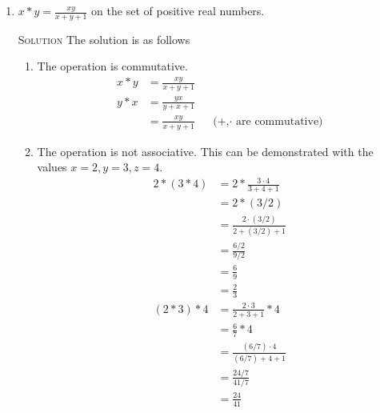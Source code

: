 \documentclass[twoside]{amsart}
\newcommand{\Solution}{\textsc{Solution}\xspace}
\newcommand{\brk}{\vspace{5pt}}
\begin{document}
\begin{enumerate}[label=\protect{\textbf{\arabic*}}, leftmargin=1em]
\begin{enumerate}
\item There is no identity element. We will prove this by
  contradiction.  Assume that there is some identity element $e$. Then
  by definition $x * e = x$ forall $x$. Let us choose a value $m = e -
  1$. Then we have $m * e = (e-1) * e = \max(e-1,e) = e \ne
  m$. Therefore, e is not an identity element. \qed. \brk

\item Since there is no identity element, there are no inverses.\brk
      
\end{enumerate}

\item $\displaystyle x * y = \frac{xy}{x + y + 1}$ on the set
  of positive real numbers. \brk

  \noindent \Solution The solution is as follows
  \begin{enumerate}
  \item The operation is commutative.
    \begin{align*}
         x * y & = \frac{xy}{x + y + 1} \\
	 y * x & = \frac{yx}{y + x + 1} \\
	       & = \frac{xy}{x + y + 1} && \text{(+,$\cdot$ are commutative)}
    \end{align*}

  \item The operation is not associative. This can be demonstrated
    with the values $x = 2, y = 3, z = 4$.
    \begin{align*}
         2 * (3 * 4) & = 2 * \frac{3 \cdot 4}{3 + 4 + 1}   \\
	             & = 2 * (3/2) \\
		     & = \frac{2 \cdot (3/2)}{2 + (3/2) + 1} \\
		     & = \frac{6/2}{9/2} \\
		     & = \frac{6}{9} \\
		     & = \frac{2}{3} \\
	 (2 * 3) * 4 & = \frac{2 \cdot 3}{2 + 3 + 1} * 4 \\
	             & = \frac{6}{7} * 4 \\
		     & = \frac{(6/7) \cdot 4}{(6/7) + 4 + 1} \\
		     & = \frac{24/7}{41/7} \\
		     & = \frac{24}{41} 
    \end{align*}


\end{enumerate}
\end{enumerate}
\end{document}
